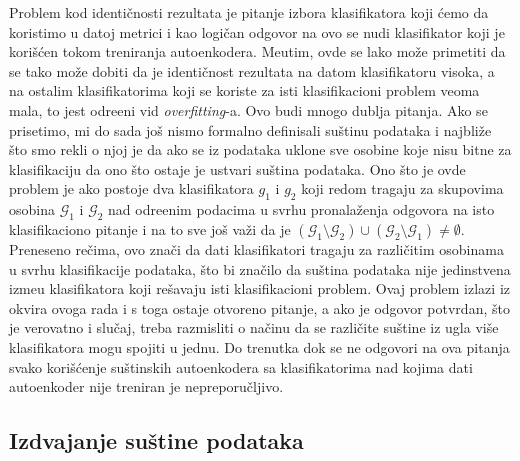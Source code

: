 \documentclass{article}
\begin{document}
	Problem kod identi\v cnosti rezultata je pitanje izbora klasifikatora koji \'cemo da koristimo u datoj metrici i kao logi\v can odgovor na ovo se nudi klasifikator koji je kori\v s\'cen tokom treniranja autoenkodera.
	Me\dj utim, ovde se lako mo\v ze primetiti da se tako mo\v ze dobiti da je identi\v cnost rezultata na datom klasifikatoru visoka, a na ostalim klasifikatorima koji se koriste za isti klasifikacioni problem veoma mala, to jest odre\dj eni vid \emph{overfitting}-a. 
	Ovo budi mnogo dublja pitanja.
	Ako se prisetimo, mi do sada jo\v s nismo formalno definisali su\v stinu podataka i najbli\v ze \v sto smo rekli o njoj je da ako se iz podataka uklone sve osobine koje nisu bitne za klasifikaciju da ono \v sto ostaje je ustvari su\v stina podataka.
	Ono \v sto je ovde problem je ako postoje dva klasifikatora $g_1$ i $g_2$ koji redom tragaju za skupovima osobina $\mathcal{G}_1$ i $\mathcal{G}_2$ nad odre\dj enim podacima u svrhu pronala\v zenja odgovora na isto klasifikaciono pitanje i na to sve jo\v s va\v zi da je $(\mathcal{G}_1 \setminus \mathcal{G}_2) \cup (\mathcal{G}_2 \setminus \mathcal{G}_1) \ne \emptyset$.
	Preneseno re\v cima, ovo zna\v ci da dati klasifikatori tragaju za razli\v citim osobinama u svrhu klasifikacije podataka, \v sto bi zna\v cilo da su\v stina podataka nije jedinstvena izme\dj u klasifikatora koji re\v savaju isti klasifikacioni problem.
	Ovaj problem izlazi iz okvira ovoga rada i s toga ostaje otvoreno pitanje, a ako je odgovor potvrdan, \v sto je verovatno i slu\v caj, treba razmisliti o na\v cinu da se razli\v cite su\v stine iz ugla vi\v se klasifikatora mogu spojiti u jednu.
	Do trenutka dok se ne odgovori na ova pitanja svako kori\v s\'cenje su\v stinskih autoenkodera sa klasifikatorima nad kojima dati autoenkoder nije treniran je nepreporu\v cljivo.
	
	\subsection{Izdvajanje su\v stine podataka}
	
\end{document}
